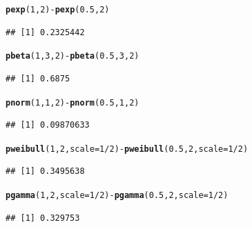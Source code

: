 \documentclass[twoside]{book}\usepackage[]{graphicx}\usepackage[]{xcolor}
\makeatletter
\newcommand{\hlnum}[1]{\textcolor[rgb]{0.686,0.059,0.569}{#1}}%
\newcommand{\hlopt}[1]{\textcolor[rgb]{0,0,0}{#1}}%
\newcommand{\hlstd}[1]{\textcolor[rgb]{0.345,0.345,0.345}{#1}}%
\newcommand{\hlkwc}[1]{\textcolor[rgb]{0.333,0.667,0.333}{#1}}%
\newcommand{\hlkwd}[1]{\textcolor[rgb]{0.737,0.353,0.396}{\textbf{#1}}}%
\newenvironment{kframe}{%
 \def\at@end@of@kframe{}%
 \ifinner\ifhmode%
  \def\at@end@of@kframe{\end{minipage}}%
  \begin{minipage}{\columnwidth}%
 \fi\fi%
 \def\FrameCommand##1{\hskip\@totalleftmargin \hskip-\fboxsep
 \colorbox{shadecolor}{##1}\hskip-\fboxsep
     \hskip-\linewidth \hskip-\@totalleftmargin \hskip\columnwidth}%
 \MakeFramed {\advance\hsize-\width
   \@totalleftmargin\z@ \linewidth\hsize
   \@setminipage}}%
 {\par\unskip\endMakeFramed%
 \at@end@of@kframe}
\newenvironment{knitrout}{}{} %
\makeatother
\begin{document}
\begin{solution}
\begin{knitrout}
\color{fgcolor}\begin{kframe}
\begin{alltt}
\hlkwd{pexp}\hlstd{(}\hlnum{1}\hlstd{,} \hlnum{2}\hlstd{)} \hlopt{-} \hlkwd{pexp}\hlstd{(}\hlnum{0.5}\hlstd{,} \hlnum{2}\hlstd{)}
\end{alltt}
\begin{verbatim}
## [1] 0.2325442
\end{verbatim}
\begin{alltt}
\hlkwd{pbeta}\hlstd{(}\hlnum{1}\hlstd{,} \hlnum{3}\hlstd{,} \hlnum{2}\hlstd{)} \hlopt{-} \hlkwd{pbeta}\hlstd{(}\hlnum{0.5}\hlstd{,} \hlnum{3}\hlstd{,} \hlnum{2}\hlstd{)}
\end{alltt}
\begin{verbatim}
## [1] 0.6875
\end{verbatim}
\begin{alltt}
\hlkwd{pnorm}\hlstd{(}\hlnum{1}\hlstd{,} \hlnum{1}\hlstd{,} \hlnum{2}\hlstd{)} \hlopt{-} \hlkwd{pnorm}\hlstd{(}\hlnum{0.5}\hlstd{,} \hlnum{1}\hlstd{,} \hlnum{2}\hlstd{)}
\end{alltt}
\begin{verbatim}
## [1] 0.09870633
\end{verbatim}
\begin{alltt}
\hlkwd{pweibull}\hlstd{(}\hlnum{1}\hlstd{,} \hlnum{2}\hlstd{,} \hlkwc{scale}\hlstd{=}\hlnum{1}\hlopt{/}\hlnum{2}\hlstd{)} \hlopt{-} \hlkwd{pweibull}\hlstd{(}\hlnum{0.5}\hlstd{,} \hlnum{2}\hlstd{,} \hlkwc{scale}\hlstd{=}\hlnum{1}\hlopt{/}\hlnum{2}\hlstd{)}
\end{alltt}
\begin{verbatim}
## [1] 0.3495638
\end{verbatim}
\begin{alltt}
\hlkwd{pgamma}\hlstd{(}\hlnum{1}\hlstd{,} \hlnum{2}\hlstd{,} \hlkwc{scale}\hlstd{=}\hlnum{1}\hlopt{/}\hlnum{2}\hlstd{)}   \hlopt{-} \hlkwd{pgamma}\hlstd{(}\hlnum{0.5}\hlstd{,} \hlnum{2}\hlstd{,} \hlkwc{scale}\hlstd{=}\hlnum{1}\hlopt{/}\hlnum{2}\hlstd{)}
\end{alltt}
\begin{verbatim}
## [1] 0.329753
\end{verbatim}
\end{kframe}
\end{knitrout}
\end{solution}
\end{document}
